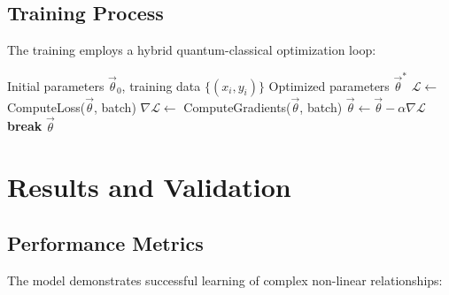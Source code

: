 \documentclass[11pt,a4paper]{article}
\begin{document}
\subsection{Training Process}

The training employs a hybrid quantum-classical optimization loop:

\begin{algorithm}
\caption{Quantum Model Training}
\begin{algorithmic}
\REQUIRE Initial parameters $\vec{\theta}_0$, training data $\{(x_i, y_i)\}$
\ENSURE Optimized parameters $\vec{\theta}^*$
        \STATE $\mathcal{L} \leftarrow$ ComputeLoss($\vec{\theta}$, batch)
        \STATE $\nabla\mathcal{L} \leftarrow$ ComputeGradients($\vec{\theta}$, batch)
        \STATE $\vec{\theta} \leftarrow \vec{\theta} - \alpha \nabla\mathcal{L}$
    \ENDFOR
        \STATE \textbf{break}
    \ENDIF
\ENDFOR
\RETURN $\vec{\theta}$
\end{algorithmic}
\end{algorithm}

\section{Results and Validation}

\subsection{Performance Metrics}

The model demonstrates successful learning of complex non-linear relationships:
\end{document}
